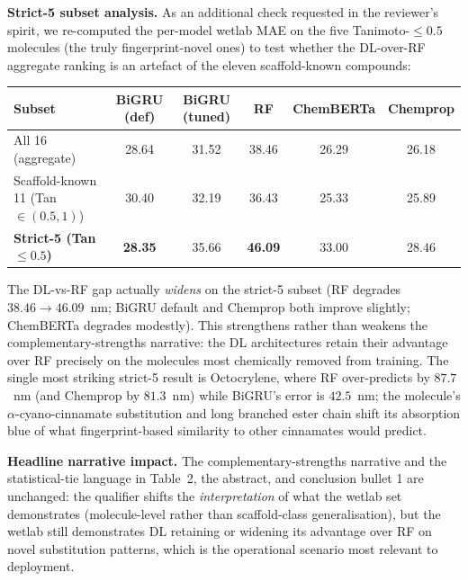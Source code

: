 \documentclass[11pt]{article}
\begin{document}
{\textbf{Strict-5 subset analysis.} As an additional check requested in the reviewer's spirit, we re-computed the per-model wetlab MAE on the five Tanimoto-$\leq 0.5$ molecules (the truly fingerprint-novel ones) to test whether the DL-over-RF aggregate ranking is an artefact of the eleven scaffold-known compounds:

\begin{center}\small
\begin{tabular}{lccccc}
\toprule
\textbf{Subset} & \textbf{BiGRU (def)} & \textbf{BiGRU (tuned)} & \textbf{RF} & \textbf{ChemBERTa} & \textbf{Chemprop} \\
\midrule
All 16 (aggregate)                       & 28.64 & 31.52 & 38.46 & 26.29 & 26.18 \\
Scaffold-known 11 (Tan $\in (0.5, 1)$)   & 30.40 & 32.19 & 36.43 & 25.33 & 25.89 \\
\textbf{Strict-5 (Tan $\leq 0.5$)}       & \textbf{28.35} & 35.66 & \textbf{46.09} & 33.00 & 28.46 \\
\bottomrule
\end{tabular}
\end{center}

The DL-vs-RF gap actually \emph{widens} on the strict-5 subset (RF degrades $38.46 \to 46.09$~nm; BiGRU default and Chemprop both improve slightly; ChemBERTa degrades modestly). This strengthens rather than weakens the complementary-strengths narrative: the DL architectures retain their advantage over RF precisely on the molecules most chemically removed from training. The single most striking strict-5 result is Octocrylene, where RF over-predicts by $87.7$~nm (and Chemprop by $81.3$~nm) while BiGRU's error is $42.5$~nm; the molecule's $\alpha$-cyano-cinnamate substitution and long branched ester chain shift its absorption blue of what fingerprint-based similarity to other cinnamates would predict.

\textbf{Headline narrative impact.} The complementary-strengths narrative and the statistical-tie language in Table~2, the abstract, and conclusion bullet 1 are unchanged: the qualifier shifts the \emph{interpretation} of what the wetlab set demonstrates (molecule-level rather than scaffold-class generalisation), but the wetlab still demonstrates DL retaining or widening its advantage over RF on novel substitution patterns, which is the operational scenario most relevant to deployment.}
\end{document}

